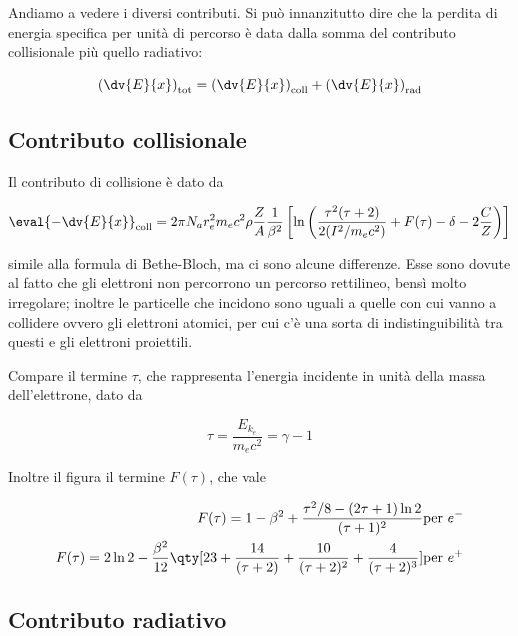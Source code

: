 \vspace{0.2cm}Andiamo a vedere i diversi contributi. Si può innanzitutto dire che la perdita di energia specifica per unità di percorso è data dalla somma del contributo collisionale più quello radiativo:

\begin{equation*}
    \left(\dv{E}{x}\right)_{\rm tot}
    =\left(\dv{E}{x}\right)_{\rm coll} + \left(\dv{E}{x}\right)_{\rm rad}
\end{equation*}

\subsection{Contributo collisionale}

Il contributo di collisione è dato da

\begin{equation*}
    \eval{-\dv{E}{x}}_{\rm coll}
    =2 \pi N_a r_e^2 m_e c^2 \rho \frac{Z}{A} \frac{1}{\beta^2} \left[\ln{\left(\frac{\tau^2 (\tau + 2)}{2(I^2/m_e c^2)} + F(\tau) - \delta - 2 \frac{C}{Z}\right)}\right]
\end{equation*}

\E simile alla formula di Bethe-Bloch, ma ci sono alcune differenze. Esse sono dovute al fatto che gli elettroni non percorrono un percorso rettilineo, bensì molto irregolare; inoltre le particelle che incidono sono uguali a quelle con cui vanno a collidere ovvero gli elettroni atomici, per cui c'è una sorta di indistinguibilità tra questi e gli elettroni proiettili.

Compare il termine $\tau$, che rappresenta l'energia incidente in unità della massa dell'elettrone, dato da

\begin{equation*}
    \tau=\frac{E_{k_e}}{m_e c^2}=\gamma - 1
\end{equation*}

Inoltre il figura il termine $F(\tau)$, che vale

\begin{eqnarray*}
    F(\tau)=1 - \beta^2 + \frac{\tau^2/8 - (2\tau + 1)\ln{2}}{(\tau + 1)^2} & \text{per } e^-
    \\
    F(\tau)=2\ln{2} - \frac{\beta^2}{12} \qty[ 23 + \frac{14}{(\tau + 2)} + \frac{10}{(\tau + 2)^2} + \frac{4}{(\tau + 2)^3} ] & \text{per } e^+
\end{eqnarray*}

\subsection{Contributo radiativo}

